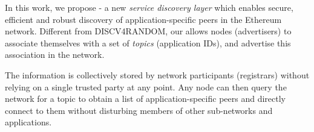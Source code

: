 


 In this work, we propose \sysname - a new \textit{service discovery layer} which enables secure, efficient and robust discovery of application-specific peers in the Ethereum network.
Different from DISCV4RANDOM, our \sysname allows nodes (\ie advertisers) to associate themselves with a set of \emph{topics} (\eg application IDs), and advertise this association in the network. 

The information is collectively stored by network participants (\ie registrars) without relying on a single trusted party at any point. Any node can then query the network for a topic to obtain a list of application-specific peers and directly connect to them without disturbing members of other sub-networks and applications. 

